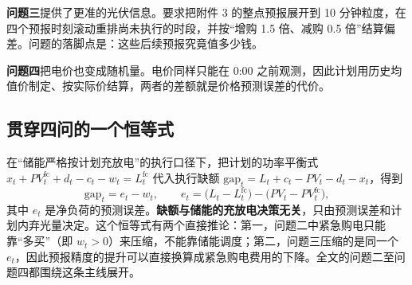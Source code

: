 \textbf{问题三}提供了更准的光伏信息。要求把附件 3 的整点预报展开到 10 分钟粒度，在四个预报时刻滚动重排尚未执行的时段，并按“增购 1.5 倍、减购 0.5 倍”结算偏差。问题的落脚点是：这些后续预报究竟值多少钱。

\textbf{问题四}把电价也变成随机量。电价同样只能在 0:00 之前观测，因此计划用历史均值价制定、按实际价结算，两者的差额就是价格预测误差的代价。

\subsection{贯穿四问的一个恒等式}

在“储能严格按计划充放电”的执行口径下，把计划的功率平衡式
$x_t+PV_t^{\text{fc}}+d_t-c_t-w_t=L_t^{\text{fc}}$
代入执行缺额 $\text{gap}_t=L_t+c_t-PV_t-d_t-x_t$，得到
\begin{equation}
\text{gap}_t=e_t-w_t,\qquad
e_t=\bigl(L_t-L_t^{\text{fc}}\bigr)-\bigl(PV_t-PV_t^{\text{fc}}\bigr),
\label{eq:identity}
\end{equation}
其中 $e_t$ 是净负荷的预测误差。\textbf{缺额与储能的充放电决策无关}，只由预测误差和计划内弃光量决定。这个恒等式有两个直接推论：第一，问题二中紧急购电只能靠“多买”（即 $w_t>0$）来压缩，不能靠储能调度；第二，问题三压缩的是同一个 $e_t$，因此预报精度的提升可以直接换算成紧急购电费用的下降。全文的问题二至问题四都围绕这条主线展开。
